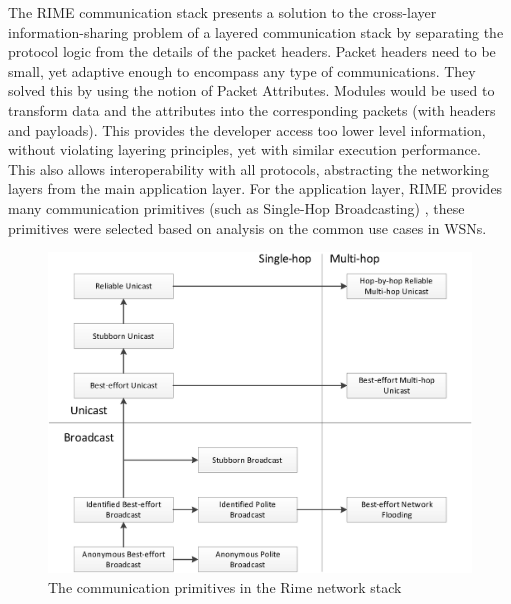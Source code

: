 The RIME communication stack presents a solution to the cross-layer information-sharing problem of a layered communication stack by separating the protocol logic from the details of the packet headers. Packet headers need to be small, yet adaptive enough to encompass any type of communications. They solved this by using the notion of Packet Attributes. Modules would be used to transform data and the attributes into the corresponding packets (with headers and payloads). This provides the developer access too lower level information, without violating layering principles, yet with similar execution performance. This also allows interoperability with all protocols, abstracting the networking layers from the main application layer. For the application layer, RIME provides many communication primitives (such as Single-Hop Broadcasting) \cite{Dunkels:2007:ACA:1322263.1322295}, these primitives were selected based on analysis on the common use cases in WSNs.

\begin{figure}[H]
	\centering
	\includegraphics[width=\textwidth]{Diagrams/rime-stack}
	\caption{The communication primitives in the Rime network stack \cite{Dunkels:2007:ACA:1322263.1322295}}
\end{figure}

